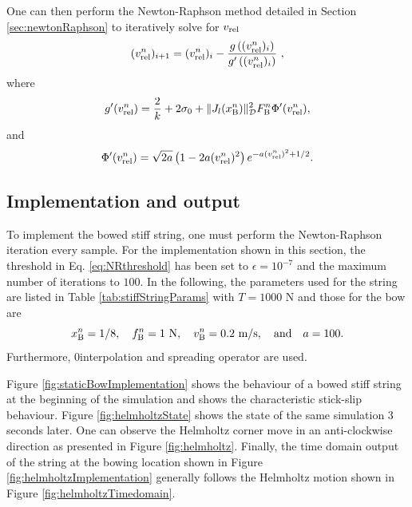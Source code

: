 One can then perform the Newton-Raphson method detailed in Section \ref{sec:newtonRaphson} to iteratively solve for $v_\text{rel}$ 
%
\begin{equation}
    (v_\text{rel}^n)_{i+1} = (v_\text{rel}^n)_i - \frac{g\left((v_\text{rel}^n)_i\right)}{g'\left((v_\text{rel}^n)_i\right)}\ ,
\end{equation}
where
\begin{equation*}
    g'(v_\text{rel}^n) = \frac{2}{k} + 2\sigma_{0} + \lVert J_l(x_{\text{B}}^n)\rVert^2_{\mathcal{D}} F_{\text{B}}^n\Phi'(v_\text{rel}^n),
\end{equation*}
and 
\begin{equation*}
    \begin{aligned}
        \Phi'(\vrel^n) %
        = \sqrt{2a}\left(1 - 2a(\vrel^n)^2\right)e^{-a(\vrel^n)^2+1/2}.
    \end{aligned}
\end{equation*}
\subsection{Implementation and output}\label{sec:staticImplementation}
To implement the bowed stiff string, one must perform the Newton-Raphson iteration every sample. For the implementation shown in this section, the threshold in Eq. \eqref{eq:NRthreshold} has been set to $\epsilon = 10^{-7}$ and the maximum number of iterations to $100$. In the following, the parameters used for the string are listed in Table \ref{tab:stiffStringParams} with $T = 1000$ N and those for the bow are
\begin{equation*}
    x_{\text{B}}^n = 1/8,\quad f_{\text{B}}^n = 1\ \text{N},\quad v_{\text{B}}^n = 0.2\  \text{m/s},\quad \text{and} \quad a = 100.
\end{equation*}
Furthermore, $0$\thOrder interpolation and spreading operator are used.

Figure \ref{fig:staticBowImplementation} shows the behaviour of a bowed stiff string at the beginning of the simulation and shows the characteristic stick-slip behaviour. Figure \ref{fig:helmholtzState} shows the state of the same simulation 3 seconds later. One can observe the Helmholtz corner move in an anti-clockwise direction as presented in Figure \ref{fig:helmholtz}. Finally, the time domain output of the string at the bowing location shown in Figure \ref{fig:helmholtzImplementation} generally follows the Helmholtz motion shown in Figure \ref{fig:helmholtzTimedomain}. 

